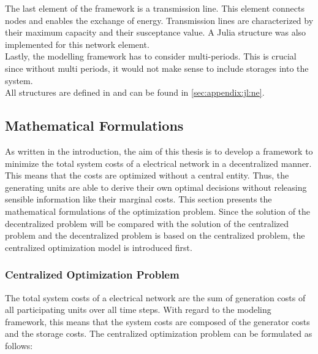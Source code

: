 The last element of the framework is a transmission line. This element connects nodes and enables the exchange of energy. Transmission lines are characterized by their maximum capacity and their susceptance value. A Julia structure was also implemented for this network element.\\

Lastly, the modelling framework has to consider multi-periods. This is crucial since without multi periods, it would not make sense to include storages into the system.\\

All structures are defined in  and can be found in \ref{sec:appendix:jl:ne}.


\subsection{Mathematical Formulations}
\label{sec:app:math-form}

As written in the introduction, the aim of this thesis is to develop a framework to minimize the total system costs of a electrical network in a decentralized manner. This means that the costs are optimized without a central entity. Thus, the generating units are able to derive their own optimal decisions without releasing sensible information like their marginal costs. This section presents the mathematical formulations of the optimization problem. Since the solution of the decentralized problem will be compared with the solution of the centralized problem and the decentralized problem is based on the centralized problem, the centralized optimization model is introduced first.

\subsubsection{Centralized Optimization Problem}

The total system costs of a electrical network are the sum of generation costs of all participating units over all time steps. With regard to the modeling framework, this means that the system costs are composed of the generator costs and the storage costs. The centralized optimization problem can be formulated as follows:

